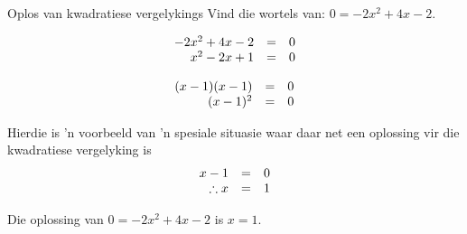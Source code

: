 \begin{wex}{Oplos van kwadratiese vergelykings }
{ Vind die wortels van: $0=-2{x}^{2}+4x-2$.}
{

\begin{equation*}
\begin{array}{ccc}\hfill -2{x}^{2}+4x-2& =& 0\hfill \\ \hfill {x}^{2}-2x+1& =& 0\hfill \end{array}
\end{equation*}


\begin{equation*}
\begin{array}{ccc} \hfill (x-1)(x-1) &=& 0 \hfill \\
\hfill (x-1)^{2} &=&0 \hfill 
\end{array}
\end{equation*}

Hierdie is 'n voorbeeld van 'n spesiale situasie waar daar net een oplossing vir die kwadratiese vergelyking is
\begin{equation*}
\begin{array}{ccc} \hfill x -1 &=& 0 \hfill \\
\hfill \therefore x &=&1 \hfill 
\end{array}
\end{equation*}


 
Die oplossing van $0=-2{x}^{2}+4x-2$ is $x=1$.
}
\end{wex}


